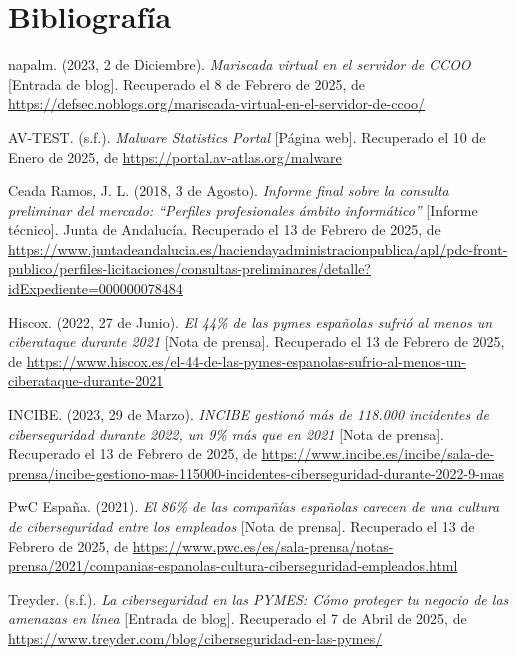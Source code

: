 \documentclass[a4paper, 11pt]{article}
\begin{document}
\section*{Bibliografía}
\begin{thebibliography}{99}
    
    napalm. (2023, 2 de Diciembre). \textit{Mariscada virtual en el servidor de CCOO} [Entrada de blog]. Recuperado el 8 de Febrero de 2025, de \url{https://defsec.noblogs.org/mariscada-virtual-en-el-servidor-de-ccoo/}

    AV-TEST. (s.f.). \textit{Malware Statistics Portal} [Página web]. Recuperado el 10 de Enero de 2025, de \url{https://portal.av-atlas.org/malware}

    Ceada Ramos, J. L. (2018, 3 de Agosto). \textit{Informe final sobre la consulta preliminar del mercado: “Perfiles profesionales ámbito informático”} [Informe técnico]. Junta de Andalucía. Recuperado el 13 de Febrero de 2025, de \url{https://www.juntadeandalucia.es/haciendayadministracionpublica/apl/pdc-front-publico/perfiles-licitaciones/consultas-preliminares/detalle?idExpediente=000000078484}

    Hiscox. (2022, 27 de Junio). \textit{El 44\% de las pymes españolas sufrió al menos un ciberataque durante 2021} [Nota de prensa]. Recuperado el 13 de Febrero de 2025, de \url{https://www.hiscox.es/el-44-de-las-pymes-espanolas-sufrio-al-menos-un-ciberataque-durante-2021}

    INCIBE. (2023, 29 de Marzo). \textit{INCIBE gestionó más de 118.000 incidentes de ciberseguridad durante 2022, un 9\% más que en 2021} [Nota de prensa]. Recuperado el 13 de Febrero de 2025, de \url{https://www.incibe.es/incibe/sala-de-prensa/incibe-gestiono-mas-115000-incidentes-ciberseguridad-durante-2022-9-mas}

    PwC España. (2021). \textit{El 86\% de las compañías españolas carecen de una cultura de ciberseguridad entre los empleados} [Nota de prensa]. Recuperado el 13 de Febrero de 2025, de \url{https://www.pwc.es/es/sala-prensa/notas-prensa/2021/companias-espanolas-cultura-ciberseguridad-empleados.html}

    Treyder. (s.f.). \textit{La ciberseguridad en las PYMES: Cómo proteger tu negocio de las amenazas en línea} [Entrada de blog]. Recuperado el 7 de Abril de 2025, de \url{https://www.treyder.com/blog/ciberseguridad-en-las-pymes/}


\end{thebibliography}
\end{document}
